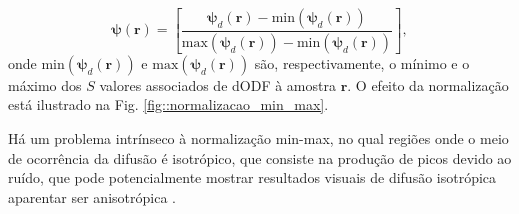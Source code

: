\documentclass[
    12pt,                %
    oneside,            %
    a4paper,            %
    english,            %
    french,                %
    spanish,            %
    brazil                %
    ]{abntex2}
\begin{document}




\begin{equation}
\label{eq::dODF2min_max}
    \boldsymbol{\psi}(\mathbf{r}) = [ \frac{\boldsymbol{\psi}_d(\mathbf{r}) - \text{min}(\boldsymbol{\psi}_d(\mathbf{r}))}{\text{max}(\boldsymbol{\psi}_d(\mathbf{r})) - \text{min}(\boldsymbol{\psi}_d(\mathbf{r}))}],
\end{equation}
onde $\text{min}(\boldsymbol{\psi}_d(\mathbf{r}))$ e $\text{max}(\boldsymbol{\psi}_d(\mathbf{r}))$ são, respectivamente, o mínimo e o máximo dos $S$ valores associados de dODF à amostra $\mathbf{r}$. O efeito da normalização está ilustrado na Fig. \ref{fig::normalizacao_min_max}. 

Há um problema intrínseco à normalização min-max, no qual regiões onde o meio de ocorrência da difusão é isotrópico, que consiste na produção de picos devido ao ruído, que pode potencialmente mostrar resultados visuais de difusão isotrópica aparentar ser anisotrópica \cite{TuchQBall2004}.


\end{document}
